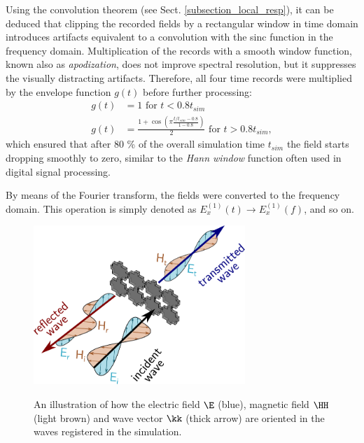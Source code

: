 \label{convolringing}
Using the convolution theorem (see Sect. \ref{subsection_local_resp}), it can be deduced that clipping the recorded fields by a rectangular window in time domain introduces artifacts equivalent to a convolution with the sinc function in the frequency domain. Multiplication of the records with a smooth window function, known also as \textit{apodization}, does not improve spectral resolution, but it suppresses the visually distracting artifacts. Therefore, all four time records were multiplied by the envelope function $g(t)$ before further processing:
\begin{equation} 
\begin{split}
	g(t) 	& = 1 \text{ for } t < 0.8 t_{sim} \\
	g(t)    & = \frac{1 + \cos\left(\pi \frac{t/t_{sim}-0.8}{1-0.8}\right)}{2}  \text{ for } t > 0.8 t_{sim},
\end{split}
\label{eq_envelope}\end{equation}
which ensured that after 80 \% of the overall simulation time $t_{sim}$ the field starts dropping smoothly to zero, similar to the \textit{Hann window} function often used in digital signal processing. 

By means of the Fourier transform, the fields were converted to the frequency domain. This operation is simply denoted as $E_{x}^{(1)}(t) \rightarrow E_{x}^{(1)}(f)$, and so on. 
\begin{figure}[ht] \caption{An illustration of how the electric field $\E$ (blue), magnetic field $\HH$ (light brown) and wave vector $\kk$ (thick arrow) are oriented in the waves registered in the simulation.}  \centering \includegraphics[width=8cm]{img/sim_separating_wave.pdf} \label{fg_separating_wave}\end{figure}

